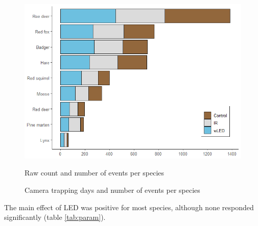 \begin{figure}[h]
 \centering
	\includegraphics[scale=.4]{../R/glmm_sp_files/figure-html/events-1.png}
 \caption[Raw count and number of events per species]
 {Raw count and number of events per species}
\caption{Camera trapping days and number of events per species}
\label{fig:events}
\end{figure}


The main effect of LED was positive for most species, although none responded significantly (table \ref{tab:param}). %
\clearpage

